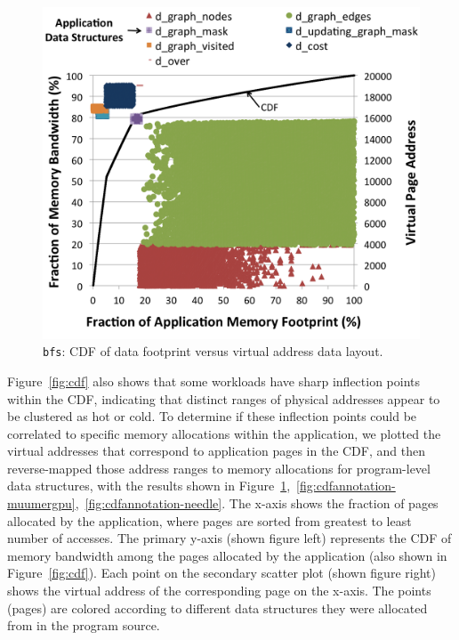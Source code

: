 \begin{figure}[t]
    \centering
    \includegraphics[width=0.9\columnwidth]{asplos2015/figures/bfsannotated.png}
    \caption{{\tt bfs}: CDF of data footprint versus virtual address data layout.}
    \label{fig:cdfannotation-bfs}
\end{figure}

Figure~\ref{fig:cdf} also shows that some workloads have sharp inflection points
within the CDF, indicating that distinct ranges of physical addresses appear to
be clustered as hot or cold. To determine if these inflection points could be
correlated to specific memory allocations within the application, we plotted the
virtual addresses that correspond to application pages in the CDF, and then
reverse-mapped those address ranges to memory allocations for program-level data
structures, with the results shown in
Figure~\ref{fig:cdfannotation-bfs},~\ref{fig:cdfannotation-muumergpu},~\ref{fig:cdfannotation-needle}\@.
{\color{black} The x-axis shows the fraction of pages allocated by the
application, where pages are sorted from greatest to least number of accesses.
The primary y-axis (shown figure left) represents the CDF of memory bandwidth
among the pages allocated by the application (also shown in
Figure~\ref{fig:cdf}).  Each point on the secondary scatter plot (shown figure
right) shows the virtual address of the corresponding page on the x-axis. The
points (pages) are colored according to different data structures they were
allocated from in the program source.}

